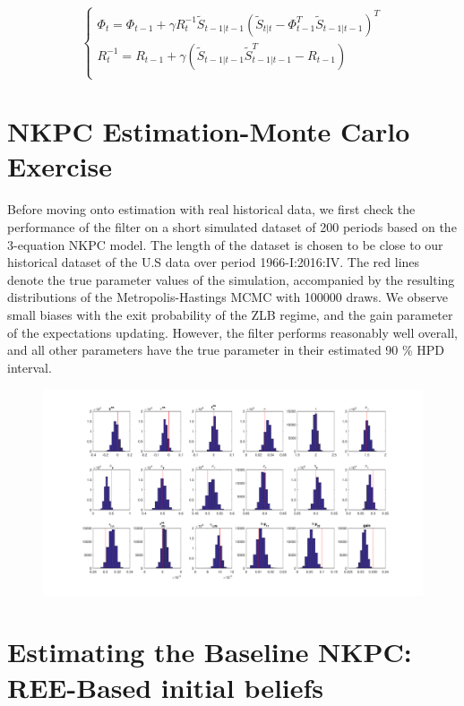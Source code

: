 \documentclass[12pt,reqno]{article}
\numberwithin{equation}{section}
\begin{document}
$$
\begin{cases}
\Phi_t = \Phi_{t-1} + \gamma R_t^{-1} \tilde{S}_{t-1|t-1}(\tilde{S}_{t|t}- \Phi_{t-1}^{T} \tilde{S}_{t-1|t-1})^{T} \\
R_t^{-1} = R_{t-1} + \gamma (\tilde{S}_{t-1|t-1}\tilde{S}_{t-1|t-1}^{T} - R_{t-1}) \\
\end{cases}
$$


\section*{NKPC Estimation-Monte Carlo Exercise}

Before moving onto estimation with real historical data, we first check the performance of the filter on a short simulated dataset of 200 periods based on the 3-equation NKPC model. The length of the dataset is chosen to be close to our historical dataset of the U.S data over period 1966-I:2016:IV. The red lines denote the true parameter values of the simulation, accompanied by the resulting distributions of the Metropolis-Hastings MCMC with 100000 draws. We observe small biases with the exit probability of the ZLB regime, and 
the gain parameter of the expectations updating. However, the filter performs reasonably well overall, and all other parameters have the true parameter in their estimated 90 \% HPD interval.\\

\begin{figure}[H]
\includegraphics[scale=0.5]{nkpc_mc_posteriors.pdf}\\
\end{figure}



\section*{Estimating the Baseline NKPC: REE-Based initial beliefs} 
\end{document}
